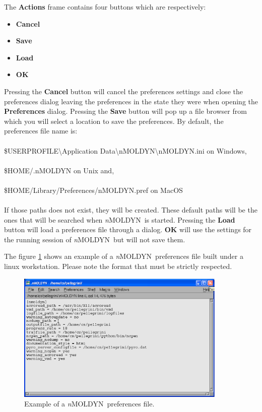 \documentclass[a4paper,11pt]{report}
\newcommand{\NMOLDYN}{\textit{n}MOLDYN}
\begin{document}
The \textbf{Actions} frame contains four buttons which are respectively:
\begin{itemize}
\item \textbf{Cancel}
\item \textbf{Save}
\item \textbf{Load}
\item \textbf{OK}
\end{itemize} 
Pressing the \textbf{Cancel} button will cancel the preferences settings and close the preferences dialog leaving the preferences in the state they
were when opening the \textbf{Preferences} dialog. 
Pressing the \textbf{Save} button will pop up a file browser from which you will select a location to save the preferences. 
By default, the preferences file name is:
\\\\
{\ttfamily \$USERPROFILE\textbackslash Application Data\textbackslash nMOLDYN\textbackslash nMOLDYN.ini} on Windows,
\\\\
{\ttfamily \$HOME/.nMOLDYN} on Unix and,
\\\\
{\ttfamily \$HOME/Library/Preferences/nMOLDYN.pref} on MacOS
\\\\
If those paths does not exist, they will be created. These default paths will be the ones that will be searched 
when \NMOLDYN\ is started. Pressing the \textbf{Load} button will load a preferences file through a dialog. \textbf{OK} will
use the settings for the running session of \NMOLDYN\ but will not save them.

The figure \ref{fig:preferences_config_file_example} shows an example of a \NMOLDYN\ preferences file built under a linux 
workstation. Please note the format that must be strictly respected.
\newpage
\begin{figure}[h!]
\begin{center}
\includegraphics[width=10cm]{Figures/preferences_config_file_example.eps}
\end{center}
\caption[Example of a preferences file]{Example of a \NMOLDYN\ preferences file.}
\label{fig:preferences_config_file_example}
\end{figure}   
\end{document}
